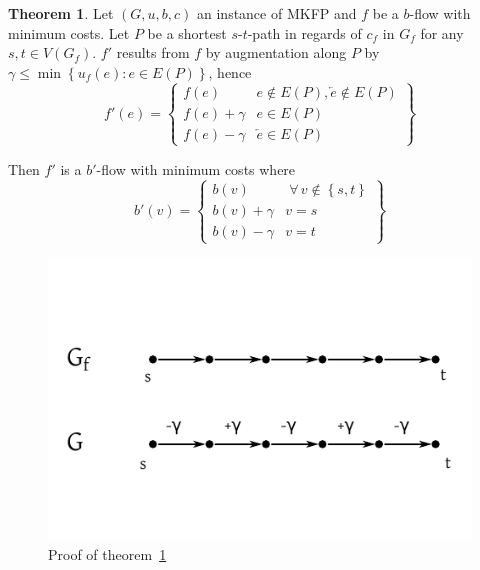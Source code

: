 \documentclass[a4paper]{article}
\theoremstyle{definition}
\newtheorem{theorem}{Theorem}
\newcommand{\set}[1]{\left\{#1\right\}}
\newcommand{\gath}[2]{$#1$-$#2$-path} %
\newcommand{\fall}{\;\forall\,}
\begin{document}
\begin{theorem}\label{satz-5.8}
  Let $(G, u, b, c)$ an instance of MKFP and $f$ be a $b$-flow with minimum costs.
  Let $P$ be a shortest \gath st in regards of $c_f$ in $G_f$ for any $s, t \in V(G_f)$.
  $f'$ results from $f$ by augmentation along $P$ by $\gamma \leq \min\set{u_f(e): e \in E(P)}$,
  hence
  \[
    f'(e) = \left\{\begin{array}{lc}
      f(e) & e \notin E(P), \overleftarrow{e} \notin E(P) \\
      f(e) + \gamma & e \in E(P) \\
      f(e) - \gamma & \overleftarrow{e} \in E(P)
    \end{array}\right\}
  \]

  Then $f'$ is a $b'$-flow with minimum costs where
  \[
    b'(v) = \left\{\begin{array}{lc}
      b(v) & \fall v \notin \set{s,t} \\
      b(v) + \gamma & v = s \\
      b(v) - \gamma & v = t
    \end{array}\right\}
  \]

  \begin{figure}[ht]
   \begin{center}
    \includegraphics{img/satz_5_8.pdf}
    \caption{Proof of theorem~\ref{satz-5.8}}
   \end{center}
  \end{figure}
\end{theorem}
\end{document}
